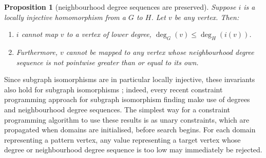 \documentclass{article}
\newtheorem{proposition}{Proposition}
\newcommand{\degree}{\operatorname{deg}}
\begin{document}
\begin{proposition}[neighbourhood degree sequences are preserved]\label{proposition:degreends}
    Suppose  $i$ is a locally injective homomorphism from a $G$ to  $H$. Let
    $v$ be any vertex. Then:
    \begin{enumerate}
        \item $i$ cannot map $v$ to a vertex of lower degree, $\degree_G(v) \le \degree_H(i(v))$.
        \item Furthermore, $v$ cannot be mapped to any vertex whose neighbourhood degree sequence is
            not pointwise greater than or equal to its own.
    \end{enumerate}
\end{proposition}
Since subgraph isomorphisms are in particular locally injective, these invariants also hold for
subgraph isomorphisms \cite{DBLP:journals/constraints/ZampelliDS10}; indeed, every recent constraint
programming approach for subgraph isomorphism finding make use of degrees and neighbourhood degree
sequences. The simplest way for a constraint programming algorithm to use these results is as unary
constraints, which are propagated when domains are initialised, before search begins. For each
domain representing a pattern vertex, any value representing a target vertex whose degree or
neighbourhood degree sequence is too low may immediately be rejected.
\end{document}
